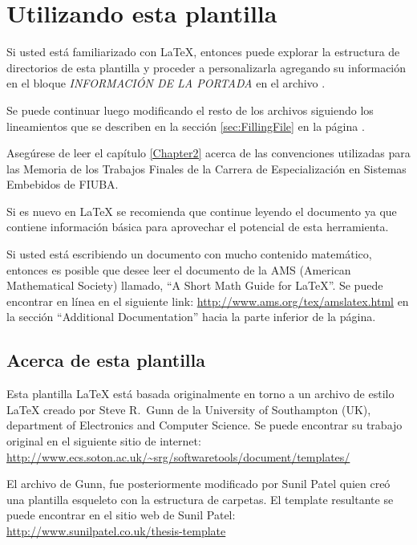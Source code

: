 
\section{Utilizando esta plantilla}

Si usted está familiarizado con \LaTeX{}, entonces puede explorar la estructura de directorios de esta plantilla y proceder a personalizarla agregando su información en el bloque \emph{INFORMACIÓN DE LA PORTADA} en el archivo .  

Se puede continuar luego modificando el resto de los archivos siguiendo los lineamientos que se describen en la sección \ref{sec:FillingFile} en la página \pageref{sec:FillingFile}.

Asegúrese de leer el capítulo \ref{Chapter2} acerca de las convenciones utilizadas para las Memoria de los Trabajos Finales de la Carrera de Especialización en Sistemas Embebidos de FIUBA.

Si es nuevo en \LaTeX{} se recomienda que continue leyendo el documento ya que contiene información básica para aprovechar el potencial de esta herramienta.

Si usted está escribiendo un documento con mucho contenido matemático, entonces es posible que desee leer el documento de la AMS (American Mathematical Society) llamado, \enquote{A Short Math Guide for \LaTeX{}}. Se puede encontrar en línea en el siguiente link: \url{http://www.ams.org/tex/amslatex.html} en la sección \enquote{Additional Documentation} hacia la parte inferior de la página.



\subsection{Acerca de esta plantilla}

Esta plantilla \LaTeX{} está basada originalmente en torno a un archivo de estilo \LaTeX{} creado por Steve R.\ Gunn de la  University of Southampton (UK), department of Electronics and Computer Science. Se puede encontrar su trabajo original en el siguiente sitio de internet:
\url{http://www.ecs.soton.ac.uk/~srg/softwaretools/document/templates/}

El archivo de Gunn,  fue posteriormente modificado por Sunil Patel quien creó una plantilla esqueleto con la estructura de carpetas. El template resultante se puede encontrar en el sitio web de Sunil Patel:
\url{http://www.sunilpatel.co.uk/thesis-template}

